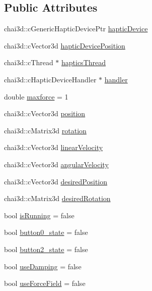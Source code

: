 \subsection*{Public Attributes}
\begin{DoxyCompactItemize}
\item 
chai3d\+::c\+Generic\+Haptic\+Device\+Ptr \hyperlink{classNovintFalconHapticsDevice_aa5184bbe68246d129003f66c3d5a9628}{haptic\+Device}
\item 
chai3d\+::c\+Vector3d \hyperlink{classNovintFalconHapticsDevice_a7815111e1968006b1a6848c040e0e310}{haptic\+Device\+Position}
\item 
chai3d\+::c\+Thread $\ast$ \hyperlink{classNovintFalconHapticsDevice_a7257d16146ffc12eed6044a7321b7397}{haptics\+Thread}
\item 
chai3d\+::c\+Haptic\+Device\+Handler $\ast$ \hyperlink{classNovintFalconHapticsDevice_a64bca002d3939aede4ecbabbe2613865}{handler}
\item 
double \hyperlink{classNovintFalconHapticsDevice_a8cdeb18d8b1e6468c6d4d2e3d2f3e55e}{maxforce} = 1
\item 
chai3d\+::c\+Vector3d \hyperlink{classNovintFalconHapticsDevice_a31027f37186c69612aaab345f6db4b2b}{position}
\item 
chai3d\+::c\+Matrix3d \hyperlink{classNovintFalconHapticsDevice_a28cf6108da9a0a2fd1830e517b4eb1f7}{rotation}
\item 
chai3d\+::c\+Vector3d \hyperlink{classNovintFalconHapticsDevice_a59f432627f7b981c9555216997110bcc}{linear\+Velocity}
\item 
chai3d\+::c\+Vector3d \hyperlink{classNovintFalconHapticsDevice_a8f71db7ac35c67569dac444e8ac91bb4}{angular\+Velocity}
\item 
chai3d\+::c\+Vector3d \hyperlink{classNovintFalconHapticsDevice_afcd63a3be7d519dd7f983414f9e0f24c}{desired\+Position}
\item 
chai3d\+::c\+Matrix3d \hyperlink{classNovintFalconHapticsDevice_acb82e8e4273b4979aae7cba6989058b6}{desired\+Rotation}
\item 
bool \hyperlink{classNovintFalconHapticsDevice_afa3018d647b1096332fc0076b9b70733}{is\+Running} = false
\item 
bool \hyperlink{classNovintFalconHapticsDevice_addebfcfc98d7e5593e369beea025e1bf}{button0\+\_\+state} = false
\item 
bool \hyperlink{classNovintFalconHapticsDevice_af016391ef02d82857ad1e65bf32faaa3}{button2\+\_\+state} = false
\item 
bool \hyperlink{classNovintFalconHapticsDevice_a8343a6b7e8c05449d1fd4daf39f346a9}{use\+Damping} = false
\item 
bool \hyperlink{classNovintFalconHapticsDevice_ab057b4217959d896c52fc5167be1314d}{use\+Force\+Field} = false
\end{DoxyCompactItemize}


